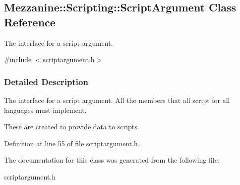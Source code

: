 \hypertarget{classMezzanine_1_1Scripting_1_1ScriptArgument}{
\subsection{Mezzanine::Scripting::ScriptArgument Class Reference}
\label{classMezzanine_1_1Scripting_1_1ScriptArgument}
}


The interface for a script argument.  




{\ttfamily \#include $<$scriptargument.h$>$}



\subsubsection{Detailed Description}
The interface for a script argument. All the members that all script for all languages must implement. \par
 \par
 These are created to provide data to scripts. 

Definition at line 55 of file scriptargument.h.



The documentation for this class was generated from the following file:\begin{DoxyCompactItemize}
\item 
scriptargument.h\end{DoxyCompactItemize}
